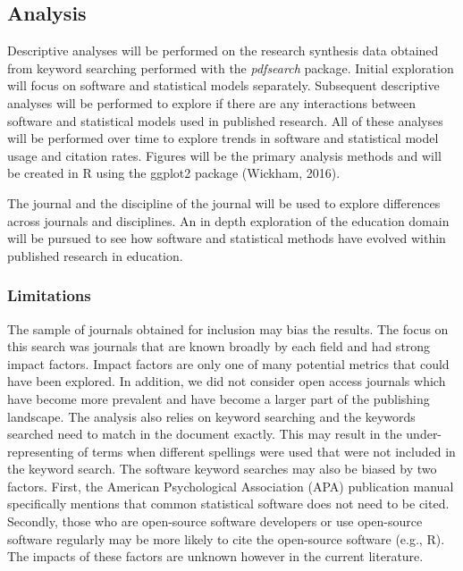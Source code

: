 \documentclass[
  english,
  ,man]{apa6}
\begin{document}
\hypertarget{analysis}{%
\subsection{Analysis}\label{analysis}}

Descriptive analyses will be performed on the research synthesis data obtained from keyword searching performed with the \emph{pdfsearch} package. Initial exploration will focus on software and statistical models separately. Subsequent descriptive analyses will be performed to explore if there are any interactions between software and statistical models used in published research. All of these analyses will be performed over time to explore trends in software and statistical model usage and citation rates. Figures will be the primary analysis methods and will be created in R using the ggplot2 package (Wickham, 2016).

The journal and the discipline of the journal will be used to explore differences across journals and disciplines. An in depth exploration of the education domain will be pursued to see how software and statistical methods have evolved within published research in education.

\hypertarget{limitations}{%
\subsubsection{Limitations}\label{limitations}}

The sample of journals obtained for inclusion may bias the results. The focus on this search was journals that are known broadly by each field and had strong impact factors. Impact factors are only one of many potential metrics that could have been explored. In addition, we did not consider open access journals which have become more prevalent and have become a larger part of the publishing landscape. The analysis also relies on keyword searching and the keywords searched need to match in the document exactly. This may result in the under-representing of terms when different spellings were used that were not included in the keyword search. The software keyword searches may also be biased by two factors. First, the American Psychological Association (APA) publication manual specifically mentions that common statistical software does not need to be cited. Secondly, those who are open-source software developers or use open-source software regularly may be more likely to cite the open-source software (e.g., R). The impacts of these factors are unknown however in the current literature.
\end{document}
